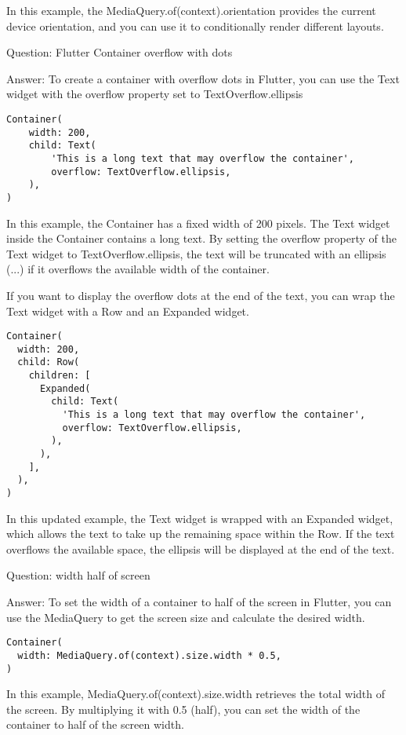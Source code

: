 In this example, the MediaQuery.of(context).orientation provides the current device orientation, and you can use it 
to conditionally render different layouts.


Question: Flutter Container overflow with dots

Answer: To create a container with overflow dots in Flutter, you can use the Text widget with the overflow 
property set to TextOverflow.ellipsis

\begin{lstlisting}
Container(
    width: 200,
    child: Text(
        'This is a long text that may overflow the container',
        overflow: TextOverflow.ellipsis,
    ),
)      
\end{lstlisting}

In this example, the Container has a fixed width of 200 pixels. The Text widget inside the Container contains a 
long text. By setting the overflow property of the Text widget to TextOverflow.ellipsis, the text will be truncated 
with an ellipsis (...) if it overflows the available width of the container.

If you want to display the overflow dots at the end of the text, you can wrap the Text widget with a Row and an 
Expanded widget. 

\begin{lstlisting}
Container(
  width: 200,
  child: Row(
    children: [
      Expanded(
        child: Text(
          'This is a long text that may overflow the container',
          overflow: TextOverflow.ellipsis,
        ),
      ),
    ],
  ),
)
\end{lstlisting}

In this updated example, the Text widget is wrapped with an Expanded widget, which allows the text to take up the 
remaining space within the Row. If the text overflows the available space, the ellipsis will be displayed at the 
end of the text.


Question: width half of screen

Answer: To set the width of a container to half of the screen in Flutter, you can use the MediaQuery to get the 
screen size and calculate the desired width. 

\begin{lstlisting}
Container(
  width: MediaQuery.of(context).size.width * 0.5,
)
\end{lstlisting}

In this example, MediaQuery.of(context).size.width retrieves the total width of the screen. By multiplying it with 0.5
 (half), you can set the width of the container to half of the screen width.

